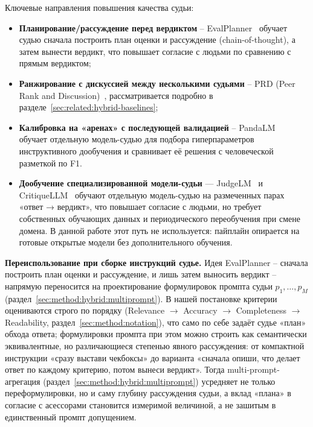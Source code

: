 Ключевые направления повышения качества судьи:

\begin{itemize}
    \item \textbf{Планирование/рассуждение перед вердиктом} --
        EvalPlanner~\cite{saha2025evalplanner} обучает судью сначала
        построить план оценки и рассуждение (chain-of-thought), а затем
        вынести вердикт, что повышает согласие с людьми по сравнению с
        прямым вердиктом;
    \item \textbf{Ранжирование с дискуссией между несколькими судьями} --
        PRD (Peer Rank and Discussion)~\cite{li2023prd}, рассматривается
        подробно в разделе~\ref{sec:related:hybrid-baselines};
    \item \textbf{Калибровка на «аренах» с последующей валидацией} --
        PandaLM~\cite{wang2023pandalm} обучает отдельную модель-судью
        для подбора гиперпараметров инструктивного дообучения и
        сравнивает её решения с человеческой разметкой по F1.
    \item \textbf{Дообучение специализированной модели-судьи} — JudgeLM~\cite{zeng2023judgelm} и CritiqueLLM~\cite{ke2023critiquellm} обучают отдельную модель-судью на размеченных парах «ответ → вердикт», что повышает согласие с людьми, но требует собственных обучающих данных и периодического переобучения при смене домена. В данной работе этот путь не используется: пайплайн опирается на готовые открытые модели без дополнительного обучения.
\end{itemize}

\textbf{Переиспользование при сборке инструкций судье.}
Идея EvalPlanner -- сначала построить план оценки и рассуждение, и лишь
затем выносить вердикт -- напрямую переносится на проектирование
формулировок промпта судьи $p_1, \dots, p_M$
(раздел~\ref{sec:method:hybrid:multiprompt}).
В нашей постановке критерии оцениваются строго по порядку
(Relevance $\to$ Accuracy $\to$ Completeness $\to$ Readability,
раздел~\ref{sec:method:notation}), что само по себе задаёт судье
«план» обхода ответа; формулировки промпта при этом можно строить как
семантически эквивалентные, но различающиеся степенью явного
рассуждения: от компактной инструкции «сразу выстави чекбоксы» до
варианта «сначала опиши, что делает ответ по каждому критерию, потом
вынеси вердикт».
Тогда multi-prompt-агрегация (раздел~\ref{sec:method:hybrid:multiprompt})
усредняет не только переформулировки, но и саму глубину рассуждения
судьи, а вклад «плана» в согласие с асессорами становится измеримой
величиной, а не зашитым в единственный промпт допущением.

